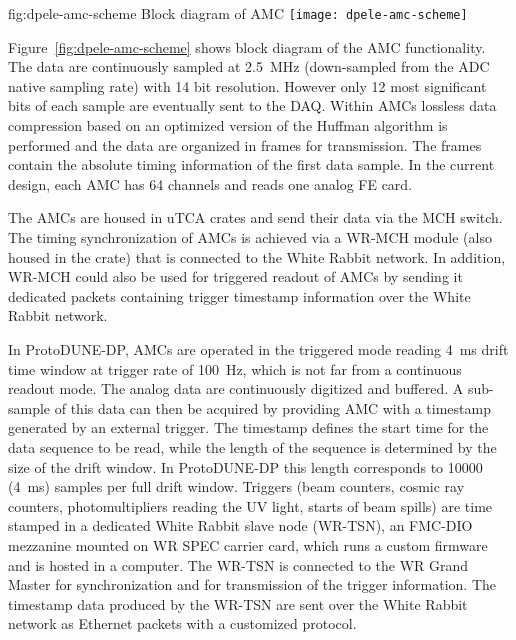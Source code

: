 \begin{dunefigure}{fig:dpele-amc-scheme}
{Block diagram of AMC}
\texttt{[image: dpele-amc-scheme]}
\end{dunefigure}

Figure~\ref{fig:dpele-amc-scheme} shows block diagram of the AMC functionality. The data are continuously sampled at \SI{2.5}{\MHz} (down-sampled from the ADC native sampling rate) with \num{14} bit resolution. However only \num{12} most significant bits of each sample are eventually sent to the DAQ. Within AMCs lossless data compression based on an optimized version of the Huffman algorithm is performed and the data are organized in frames for transmission. The frames contain the absolute timing information of the first data sample.  In the current design, each AMC has 64 channels and reads one analog FE card.

The AMCs are housed in uTCA crates and send their data via the MCH switch. The timing synchronization of AMCs is achieved via a WR-MCH module (also housed in the crate) that is connected to the White Rabbit network. In addition, WR-MCH could also be used for triggered readout of AMCs by sending it dedicated packets containing trigger timestamp information over the White Rabbit network.

In ProtoDUNE-DP, AMCs are operated in the triggered mode reading \SI{4}{\milli\second} drift time window at trigger rate of \SI{100}{Hz}, which is not far from a continuous readout mode. The analog data are continuously digitized and buffered. A sub-sample of this data can then be acquired by providing AMC with a timestamp generated by an external trigger. The timestamp defines the start time for the data sequence to be read, while the length of the sequence is determined by the size of the drift window. In ProtoDUNE-DP this length corresponds to \num{10000} (\SI{4}{\milli\second}) samples per full drift window.  Triggers (beam counters, cosmic ray counters, photomultipliers reading the UV light, starts of beam spills) are time stamped in a dedicated White Rabbit slave node (WR-TSN), an FMC-DIO mezzanine mounted on WR SPEC carrier card, which runs a custom firmware and is hosted in a computer. The WR-TSN is connected to the WR Grand Master for synchronization and for transmission of the trigger information. The timestamp data produced by the WR-TSN are sent over the White Rabbit network as Ethernet packets with a customized protocol. 

